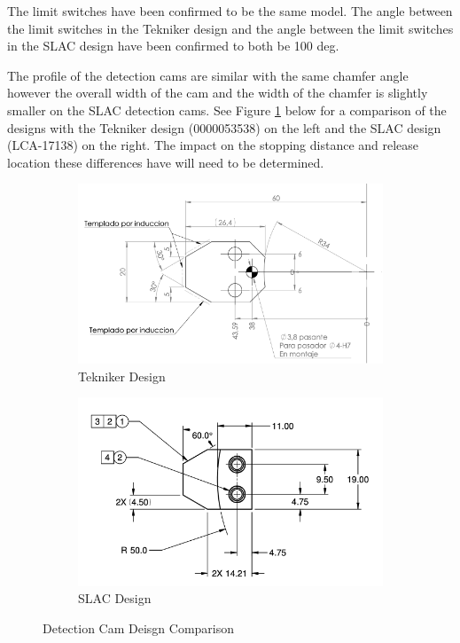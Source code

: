 \documentclass[SE,lsstdraft,authoryear,toc]{lsstdoc}
\begin{document}
The limit switches have been confirmed to be the same model. The angle
between the limit switches in the Tekniker design and the angle between
the limit switches in the SLAC design have been confirmed to both be 100
deg.

The profile of the detection cams are similar with the same chamfer
angle however the overall width of the cam and the width of the chamfer
is slightly smaller on the SLAC detection cams. See Figure \ref{fig:Figure_4} below for a
comparison of the designs with the Tekniker design (0000053538) on the
left and the SLAC design (LCA-17138) on the right. The impact on the
stopping distance and release location these differences have will need
to be determined.

\begin{figure}[h!]
  \centering
  \begin{subfigure}{0.45\linewidth}
    \centering
    \includegraphics[width=\linewidth]{media/teknikerDrawing.png}
    \caption{Tekniker Design}
  \end{subfigure}
  \begin{subfigure}{0.45\linewidth}
    \centering
    \includegraphics[width=\linewidth]{media/slacDrawing.png}
    \caption{SLAC Design}
  \end{subfigure}
  \caption{Detection Cam Deisgn Comparison}
  \label{fig:Figure_4}
\end{figure}
\end{document}
